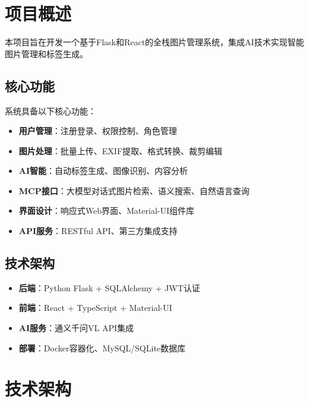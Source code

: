 \documentclass[cs4size,a4paper]{ctexart}
\numberwithin{equation}{section}
\numberwithin{table}{section}
\numberwithin{figure}{section}
\begin{document}
\pagestyle{plain}
\pagestyle{empty}
\tableofcontents
\thispagestyle{empty}
\newpage

\pagestyle{fancy}

\section{项目概述}

本项目旨在开发一个基于Flask和React的全栈图片管理系统，集成AI技术实现智能图片管理和标签生成。

\subsection{核心功能}

系统具备以下核心功能：
\begin{itemize}
    \item \textbf{用户管理}：注册登录、权限控制、角色管理
    \item \textbf{图片处理}：批量上传、EXIF提取、格式转换、裁剪编辑
    \item \textbf{AI智能}：自动标签生成、图像识别、内容分析
    \item \textbf{MCP接口}：大模型对话式图片检索、语义搜索、自然语言查询
    \item \textbf{界面设计}：响应式Web界面、Material-UI组件库
    \item \textbf{API服务}：RESTful API、第三方集成支持
\end{itemize}

\subsection{技术架构}

\begin{itemize}
    \item \textbf{后端}：Python Flask + SQLAlchemy + JWT认证
    \item \textbf{前端}：React + TypeScript + Material-UI
    \item \textbf{AI服务}：通义千问VL API集成
    \item \textbf{部署}：Docker容器化、MySQL/SQLite数据库
\end{itemize}

\newpage

\section{技术架构}
\end{document}
